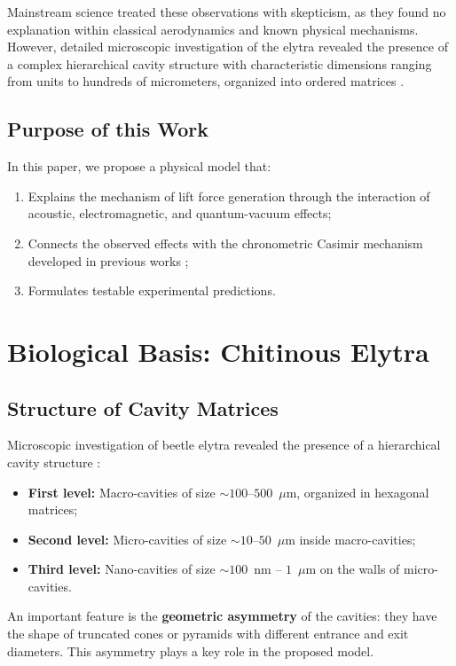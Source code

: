 \documentclass[12pt,a4paper]{article}
\begin{document}
Mainstream science treated these observations with skepticism, as they found no explanation within classical aerodynamics and known physical mechanisms. However, detailed microscopic investigation of the elytra revealed the presence of a complex hierarchical cavity structure with characteristic dimensions ranging from units to hundreds of micrometers, organized into ordered matrices \cite{grebennikov}.

\subsection{Purpose of this Work}

In this paper, we propose a physical model that:
\begin{enumerate}
    \item Explains the mechanism of lift force generation through the interaction of acoustic, electromagnetic, and quantum-vacuum effects;
    \item Connects the observed effects with the chronometric Casimir mechanism developed in previous works \cite{chrono_casimir, fermi_1923};
    \item Formulates testable experimental predictions.
\end{enumerate}

\section{Biological Basis: Chitinous Elytra}

\subsection{Structure of Cavity Matrices}

Microscopic investigation of beetle elytra revealed the presence of a hierarchical cavity structure \cite{grebennikov}:
\begin{itemize}
    \item \textbf{First level:} Macro-cavities of size $\sim 100$--$500$~$\mu$m, organized in hexagonal matrices;
    \item \textbf{Second level:} Micro-cavities of size $\sim 10$--$50$~$\mu$m inside macro-cavities;
    \item \textbf{Third level:} Nano-cavities of size $\sim 100$~nm -- $1$~$\mu$m on the walls of micro-cavities.
\end{itemize}

An important feature is the \textbf{geometric asymmetry} of the cavities: they have the shape of truncated cones or pyramids with different entrance and exit diameters. This asymmetry plays a key role in the proposed model.
\end{document}
